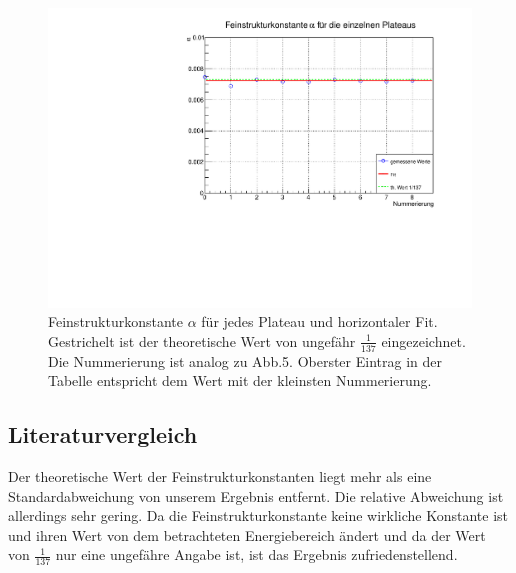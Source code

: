 \begin{figure}[h]
\centering
\includegraphics[scale=0.45]{../plots/alpha.pdf}
\caption{Feinstrukturkonstante $\alpha$ für jedes Plateau und horizontaler Fit. Gestrichelt ist der theoretische Wert von ungefähr $\frac{1}{137}$ eingezeichnet. Die Nummerierung ist analog zu Abb.5. Oberster Eintrag in der Tabelle entspricht dem Wert mit der kleinsten Nummerierung.}
\end{figure}


\subsection{Literaturvergleich}
Der theoretische Wert der Feinstrukturkonstanten liegt mehr als eine Standardabweichung von unserem Ergebnis entfernt. Die relative Abweichung ist allerdings sehr gering. Da die Feinstrukturkonstante keine wirkliche Konstante ist und ihren Wert von dem betrachteten Energiebereich ändert und da der Wert von $\frac{1}{137}$ nur eine ungefähre Angabe ist, ist das Ergebnis zufriedenstellend.